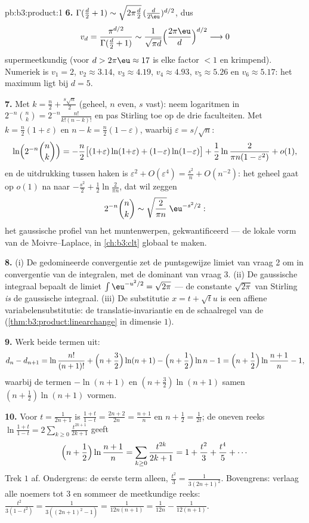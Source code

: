 \begin{solution}{pb:b3:product:1}
\textbf{6.} $\Gamma(\frac d2 + 1) \sim \sqrt{2\pi\frac
d2}\,(\frac d{2\eu})^{d/2}$, dus
\[
v_d = \frac{\pi^{d/2}}{\Gamma(\frac d2 + 1)}
\sim \frac{1}{\sqrt{\pi d}}\Bigl(\frac{2\pi\eu}
d\Bigr)^{d/2} \longrightarrow 0
\]
supermeetkundig (voor $d > 2\pi\eu \approx 17$ is elke factor $<
1$ en krimpend). Numeriek is $v_1 = 2$, $v_2 \approx 3.14$, $v_3
\approx 4.19$, $v_4 \approx 4.93$, $v_5 \approx 5.26$ en $v_6
\approx 5.17$: het maximum ligt bij $d = 5$.

\textbf{7.} Met $k = \frac n2 + \frac{s\sqrt n}2$ (geheel, $n$
even, $s$ vast): neem logaritmen in $2^{-n}\binom nk =
2^{-n}\frac{n!}{k!(n-k)!}$ en pas Stirling toe op de drie
faculteiten. Met $k = \frac n2(1 + \varepsilon)$ en $n - k =
\frac n2(1 - \varepsilon)$, waarbij $\varepsilon = s/\sqrt n$:
\[
\ln\Bigl(2^{-n}\binom nk\Bigr)
= -\frac n2\bigl[(1{+}\varepsilon)\ln(1{+}\varepsilon) +
(1{-}\varepsilon)\ln(1{-}\varepsilon)\bigr]
+ \frac12\ln\frac{2}{\pi n(1 - \varepsilon^2)} + o(1),
\]
en de uitdrukking tussen haken is $\varepsilon^2 +
O(\varepsilon^4) = \frac{s^2}n + O(n^{-2})$: het geheel gaat op
$o(1)$ na naar $-\frac{s^2}2 + \frac12\ln\frac2{\pi n}$, dat wil
zeggen
\[
2^{-n}\binom nk \sim \sqrt{\frac{2}{\pi
n}}\;\eu^{-s^2/2} :
\]
het gaussische profiel van het muntenwerpen, gekwantificeerd ---
de lokale vorm van de Moivre--Laplace, in \cref{ch:b3:clt}
globaal te maken.

\textbf{8.} (i) De gedomineerde convergentie zet de puntsgewijze
limiet van vraag 2 om in convergentie van de integralen, met de
dominant van vraag 3. (ii) De gaussische integraal bepaalt de
limiet $\int\eu^{-u^2/2} = \sqrt{2\pi}$ --- de constante
$\sqrt{2\pi}$ van Stirling \emph{is} de gaussische integraal.
(iii) De substitutie $x = t + \sqrt tu$ is een affiene
variabelensubstitutie: de translatie-invariantie en de schaalregel
van de  (\cref{thm:b3:product:linearchange} in
dimensie $1$).

\textbf{9.} Werk beide termen uit:
\[
d_n - d_{n+1} = \ln\frac{n!}{(n+1)!} + \Bigl(n +
\frac32\Bigr)\ln(n+1) - \Bigl(n + \frac12\Bigr)\ln n - 1
= \Bigl(n + \frac12\Bigr)\ln\frac{n+1}n - 1,
\]
waarbij de termen $-\ln(n+1)$ en $(n + \frac32)\ln(n+1)$ samen $(n
+ \frac12)\ln(n+1)$ vormen.

\textbf{10.} Voor $t = \frac1{2n+1}$ is $\frac{1+t}{1-t} =
\frac{2n+2}{2n} = \frac{n+1}n$ en $n + \frac12 = \frac1{2t}$; de
oneven reeks $\ln\frac{1+t}{1-t} =
2\sum_{k\geq0}\frac{t^{2k+1}}{2k+1}$ geeft
\[
\Bigl(n + \frac12\Bigr)\ln\frac{n+1}n
= \sum_{k\geq0}\frac{t^{2k}}{2k+1}
= 1 + \frac{t^2}3 + \frac{t^4}5 + \cdots
\]
Trek $1$ af. Ondergrens: de eerste term alleen, $\frac{t^2}3 =
\frac1{3(2n+1)^2}$. Bovengrens: verlaag alle noemers tot $3$ en
sommeer de meetkundige reeks: $\frac{t^2}{3(1 - t^2)} =
\frac1{3((2n+1)^2 - 1)} = \frac1{12n(n+1)} = \frac1{12n} -
\frac1{12(n+1)}$.


\end{solution}
